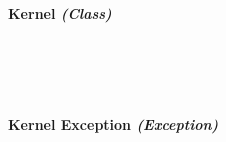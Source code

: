 \begin{flushleft}
\begin{enumerate}
    \begin{figure}[H]
        \centering
    \end{figure}\\

    \bk

    \paragraph{Kernel \textit{(Class)}} \mbox{} \\

    \begin{figure}[H]
        \centering
    \end{figure}\\

    \bk

    
    \paragraph{Kernel Exception \textit{(Exception)}} \mbox{} \\


\end{enumerate}
\end{flushleft}
